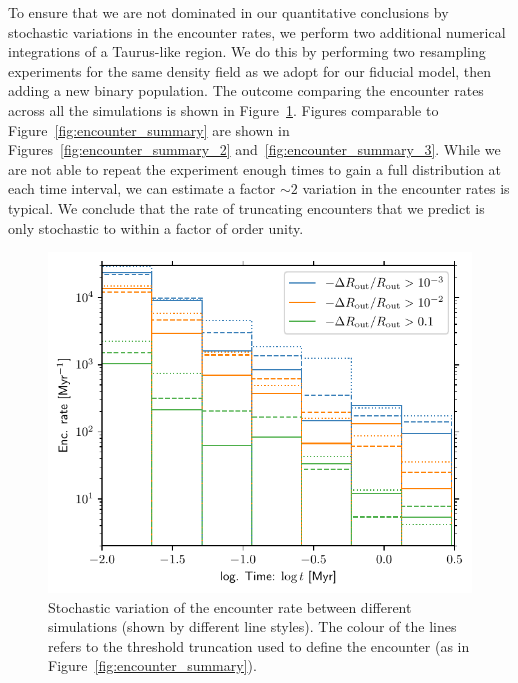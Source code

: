 \documentclass{aa}
\begin{document}
To ensure that we are not dominated in our quantitative conclusions by stochastic variations in the encounter rates, we perform two additional numerical integrations of a Taurus-like region. We do this by performing two resampling experiments for the same density field as we adopt for our fiducial model, then adding a new binary population. The outcome comparing the encounter rates across all the simulations is shown in Figure~\ref{fig:stoch_encrate}. Figures comparable to Figure~\ref{fig:encounter_summary} are shown in Figures~\ref{fig:encounter_summary_2} and~\ref{fig:encounter_summary_3}. While we are not able to repeat the experiment enough times to gain a full distribution at each time interval, we can estimate a factor $\sim 2$ variation in the encounter rates is typical. We conclude that the rate of truncating encounters that we predict is only stochastic to within a factor of order unity. 

\begin{figure}
    \centering
    \includegraphics[width=\columnwidth]{Figures/stochastic_encrate.pdf}
    \caption{Stochastic variation of the encounter rate between different simulations (shown by different line styles). The colour of the lines refers to the threshold truncation used to define the encounter (as in Figure~\ref{fig:encounter_summary}).}
    \label{fig:stoch_encrate}
\end{figure}
\end{document}
